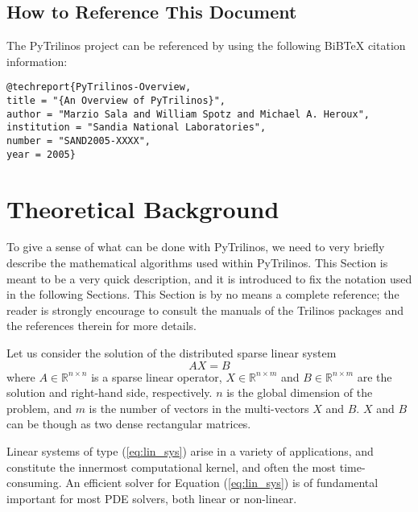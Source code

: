 \documentclass[10pt,relax]{SANDreport}
\begin{document}
\subsection{How to Reference This Document}
\label{sec:reference}

The PyTrilinos project can be referenced by using the following BiBTeX
citation information: 
\begin{verbatim}
@techreport{PyTrilinos-Overview,
title = "{An Overview of PyTrilinos}",
author = "Marzio Sala and William Spotz and Michael A. Heroux",
institution = "Sandia National Laboratories",
number = "SAND2005-XXXX",
year = 2005}
\end{verbatim}

\section{Theoretical Background}
\label{sec:background}

To give a sense of what can be done with PyTrilinos, we need to very briefly
describe the mathematical algorithms used within PyTrilinos. This Section is
meant to be a very quick description, and it is introduced to fix the notation
used in the following Sections. This Section is by no means a complete
reference; the reader is strongly encourage to consult the manuals of the
Trilinos packages and the references therein for more details.

\medskip

Let us consider the solution of the distributed sparse linear system
\begin{equation}
\label{eq:lin_sys}
A X = B
\end{equation}
where $A \in \mathbb{R}^{n \times n}$ is a sparse linear operator, $X \in
\mathbb{R}^{n \times m}$ and $B \in \mathbb{R}^{n \times m}$ are the solution
and right-hand side, respectively. $n$ is the global dimension of the problem,
  and $m$ is the number of vectors in the multi-vectors $X$ and $B$.
  $X$ and $B$ can be though as two dense rectangular matrices.

Linear systems of type (\ref{eq:lin_sys}) arise in a variety of applications,
and constitute the innermost computational kernel, and often the most
time-consuming. An efficient solver for Equation (\ref{eq:lin_sys}) is of
fundamental important for most PDE solvers, both linear or non-linear.
\end{document}
